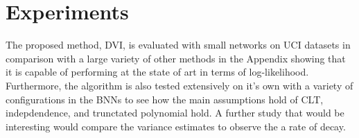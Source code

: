 \section{Experiments}

The proposed method, DVI, is evaluated with small networks on UCI datasets in comparison with a large variety of other methods in the Appendix showing that it is capable of performing at the state of art in terms of log-likelihood. Furthermore, the algorithm is also tested extensively on it's own with a variety of configurations in the BNNs to see how the main assumptions hold of CLT, indepdendence, and trunctated polynomial hold. A further study that would be interesting would compare the variance estimates to observe the a rate of decay. 


